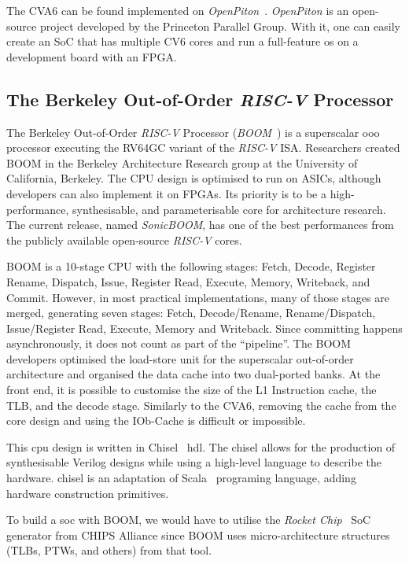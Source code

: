 The CVA6 can be found implemented on \textit{OpenPiton}~\cite{Balkind:2016:OOS:2872362.2872414}. \textit{OpenPiton} is an open-source project developed by the Princeton Parallel Group. With it, one can easily create an SoC that has multiple CV6 cores and run a full-feature \acrfull{os} on a development board with an FPGA.

\subsection{The Berkeley Out-of-Order \textit{RISC-V} Processor}
The Berkeley Out-of-Order \textit{RISC-V} Processor (\textit{BOOM}~\cite{zhaosonicboom}) is a superscalar \acrfull{ooo} processor executing the RV64GC variant of the \textit{RISC-V} ISA. Researchers created BOOM in the Berkeley Architecture Research group at the University of California, Berkeley. The CPU design is optimised to run on ASICs, although developers can also implement it on FPGAs. Its priority is to be a high-performance, synthesisable, and parameterisable core for architecture research. The current release, named \textit{SonicBOOM}, has one of the best performances from the publicly available open-source \textit{RISC-V} cores.

BOOM is a 10-stage CPU with the following stages: Fetch, Decode, Register Rename, Dispatch, Issue, Register Read, Execute, Memory, Writeback, and Commit. However, in most practical implementations, many of those stages are merged, generating seven stages: Fetch, Decode/Rename, Rename/Dispatch, Issue/Register Read, Execute, Memory and Writeback. Since committing happens asynchronously, it does not count as part of the \enquote{pipeline}. The BOOM developers optimised the load-store unit for the superscalar out-of-order architecture and organised the data cache into two dual-ported banks. At the front end, it is possible to customise the size of the L1 Instruction cache, the TLB, and the decode stage. Similarly to the CVA6, removing the cache from the core design and using the IOb-Cache is difficult or impossible.

This \acrshort{cpu} design is written in Chisel~\cite{bachrach2012chisel} \acrfull{hdl}. The \acrfull{chisel} allows for the production of synthesisable Verilog designs while using a high-level language to describe the hardware. \acrshort{chisel} is an adaptation of Scala~\cite{odersky2004scala} programing language, adding hardware construction primitives.

To build a \acrfull{soc} with BOOM, we would have to utilise the \textit{Rocket Chip}~\cite{asanovic2016rocket} SoC generator from CHIPS Alliance since BOOM uses micro-architecture structures (TLBs, PTWs, and others) from that tool.

